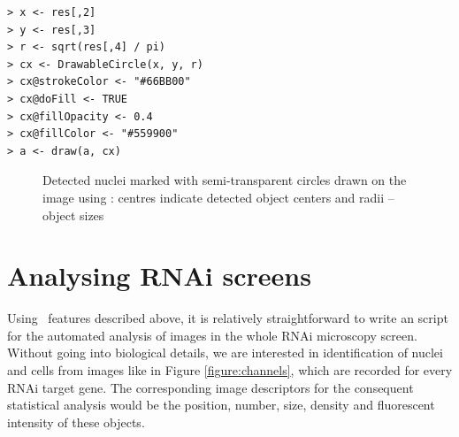 \begin{verbatim}
> x <- res[,2]
> y <- res[,3]
> r <- sqrt(res[,4] / pi)
> cx <- DrawableCircle(x, y, r)
> cx@strokeColor <- "#66BB00"
> cx@doFill <- TRUE
> cx@fillOpacity <- 0.4
> cx@fillColor <- "#559900"
> a <- draw(a, cx)
\end{verbatim}

\begin{figure}
\vspace*{.1in}
\begin{center}
\end{center}
\caption{\label{figure:drawables}
    Detected nuclei marked with semi-transparent circles drawn on the image using : centres indicate detected object centers and radii -- object sizes
}
\end{figure}

\section*{Analysing RNAi screens}

Using \EBImage\ features described above, it is relatively straightforward to write an \R{} script for the automated analysis of images in the whole RNAi microscopy screen. Without going into biological details, we are interested in identification of nuclei and cells from images like in Figure \ref{figure:channels}, which are recorded for every RNAi target gene. The corresponding image descriptors for the consequent statistical analysis would be the position, number, size, density and fluorescent intensity of these objects.

